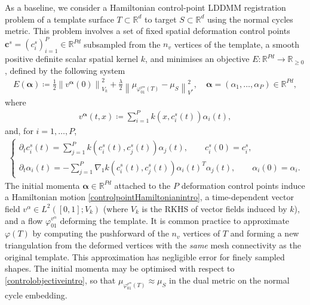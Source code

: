 \documentclass[sn-mathphys-num]{sn-jnl}%
\theoremstyle{thmstyleone}%
\theoremstyle{thmstyletwo}%
\theoremstyle{thmstylethree}%
\numberwithin{remark}{section}
\numberwithin{definition}{section}
\numberwithin{equation}{section}
\numberwithin{theorem}{section}
\newcommand{\norm}[1]{\left\lVert#1\right\rVert}
\newcommand{\R}{\ensuremath{\mathbb{R}}}%
\newcommand{\tit}[1]{\textit{#1}}
\begin{document}
  As a baseline, we consider a Hamiltonian control-point LDDMM \cite{Sparseadaptiveparam} registration problem of a template surface $T  \subset \R^{d}$ to target $S \subset \R^{d}$ using the normal cycles metric. This problem involves a set of fixed spatial deformation control points $\bm{c}^{s}=(c_{i}^{s})_{i=1}^{P} \in \R^{Pd}$ subsampled from the $n_{v}$ vertices of the template, a smooth positive definite scalar spatial kernel $k$, and minimises an objective $E\colon \R^{Pd}  \to \R_{\geq 0}$, defined by the following system
\begin{align}\label{controlobjectiveintro}
E(\bm{\alpha}) \coloneq \frac{1}{2}\norm{v^{\bm{\alpha} }(0)}_{V_{k}}^{2} + \frac{\lambda}{2}\norm{\mu_{\varphi^{v^{\bm{\alpha} }}_{01}(T) } - \mu_{S} }_{V^{*}}^2,\quad \bm{\alpha} =(\alpha_{1},\dots,\alpha_{P} ) \in \R^{Pd},
\end{align}
where
\begin{align}\label{controlpointfieldintro}
v^{\bm{\alpha} }(t,x) \coloneq \sum_{i=1}^{{P}}{k(x,c_{i}^{s}(t))\alpha_{i}(t)},
\end{align}
and, for $i=1,\dots,P$,
\begin{align}\label{controlpointHamiltonianintro}
\begin{cases}\displaystyle
 \partial_{t}c_{i}^{s}(t) = \sum_{j=1}^{P}{k(c_{i}^{s}(t),c_{j}^{s}(t))\alpha_{j}(t)},\qquad c_{i}^{s}(0) = c_{i}^{s},\\ \displaystyle
 \partial_{t}\alpha_{i}(t) = -\sum_{j=1}^{P}{\nabla_{1}k(c_{i}^{s}(t),c_{j}^{s}(t))\alpha_{i}(t)^{T}\alpha_{j}(t)},\qquad \alpha_{i}(0) = \alpha_{i}.
\end{cases}
\end{align}
 The initial momenta $\bm{\alpha}\in \R^{Pd}$ attached to the $P$ deformation control points induce a Hamiltonian motion \cref{controlpointHamiltonianintro}, a time-dependent vector field $v^{\alpha} \in L^{2}([0,1];V_{k}) $ (where $V_{k}$ is the RKHS of vector fields induced by $k$), and a flow $\varphi_{01}^{v^{\alpha}}$ deforming the template. It is common practice \cite{GlaunesCurrents} to approximate $\varphi(T)$ by computing the pushforward of the $n_{v}$ vertices of $T$ and forming a new triangulation from the deformed vertices with the \tit{same} mesh connectivity as the original template. This approximation has negligible error for finely sampled shapes. The initial momenta may be optimised with respect to  \cref{controlobjectiveintro}, so that $\mu_{\varphi^{v^{\bm{\alpha} }}_{01}(T) } \approx \mu_{S}$  in the dual metric on the normal cycle embedding.
 
\end{document}
